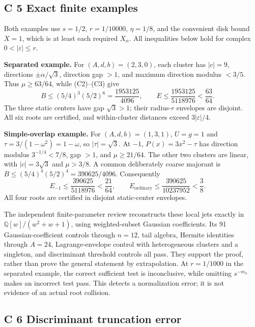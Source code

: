 \documentclass[
  11pt,
]{article}
\begin{document}
\subsection{C 5 Exact finite examples}

Both examples use \(s=1/2\), \(r=1/10000\), \(\eta=1/8\), and
the convenient disk bound \(X=1\), which is at least each required
\(X_\alpha\). All inequalities below hold for complex
\(0<|\varepsilon|\leq r\).

\textbf{Separated example.} For \((A,d,b)=(2,3,0)\), each cluster
has \(|c|=9\), directions \(\pm\alpha/\sqrt3\), direction gap
\(>1\), and maximum direction modulus \(<3/5\). Thus
\(\mu\geq63/64\), while (C2)--(C3) give
\[
B\leq(5/4)^3(5/2)^6=\frac{1953125}{4096},\qquad
E\leq\frac{1953125}{5118976}<\frac{63}{64}.
\tag{C14}
\]
The three static centers have gap \(\sqrt3>1\); their radius-\(r\)
envelopes are disjoint. All six roots are certified, and within-cluster
distances exceed \(3|\varepsilon|/4\).

\textbf{Simple-overlap example.} For \((A,d,b)=(1,3,1)\),
\(U=g=1\) and \(\tau=3/(1-\omega^2)=1-\omega\), so
\(|\tau|=\sqrt3\). At \(-1\), \(P(x)=3x^2-\tau\) has direction
modulus \(3^{-1/4}<7/8\), gap \(>1\), and
\(\mu\geq21/64\). The other two clusters are linear, with
\(|c|=3\sqrt3\) and \(\mu>3/8\). A common deliberately coarse
majorant is \(B\leq(5/4)^4(5/2)^4=390625/4096\). Consequently
\[
E_{-1}\leq\frac{390625}{5118976}<\frac{21}{64},\qquad
E_{\mathrm{ordinary}}\leq\frac{390625}{10237952}<\frac38.
\tag{C15}
\]
All four roots are certified in disjoint static-center envelopes.

The independent finite-parameter review reconstructs these local jets
exactly in \(\mathbb Q[w]/(w^2+w+1)\), using weighted-subset Gaussian
coefficients. Its 91 Gaussian-coefficient controls through \(n=12\),
tail algebra, Hermite identities through \(A=24\), Lagrange-envelope
control with heterogeneous clusters and a singleton, and discriminant
threshold controls all pass. They support the proof, rather than prove
the general statement by extrapolation. At \(r=1/1000\) in the
separated example, the correct sufficient test is inconclusive, while
omitting \(s^{-m_\alpha}\) makes an incorrect test pass. This detects a
normalization error; it is not evidence of an actual root collision.

\subsection{C 6 Discriminant truncation error}
\end{document}

